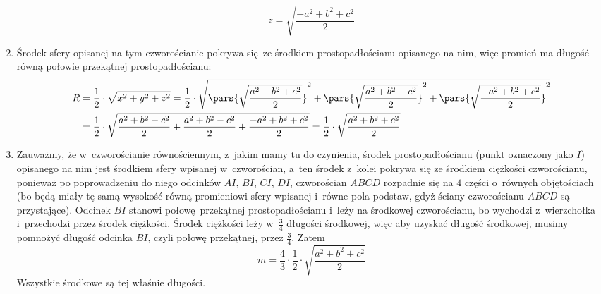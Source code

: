 \begin{enumerate}[label={\alph*)}]
\begin{equation*}
            z = \sqrt{\frac{-a^2 + b^2 + c^2}{2}}
        \end{equation*}
    \item Środek sfery opisanej na tym czworościanie pokrywa się ze środkiem prostopadłościanu opisanego na nim, więc promień ma długość równą połowie przekątnej prostopadłościanu:
        \begin{equation*}
            \begin{split}
                R
                &= \frac{1}{2} \cdot \sqrt{x^2 + y^2 + z^2}
                = \frac{1}{2} \cdot \sqrt{\pars{\sqrt{\frac{a^2 - b^2 + c^2}{2}}}^2 + \pars{\sqrt{\frac{a^2 + b^2 - c^2}{2}}}^2 + \pars{\sqrt{\frac{-a^2 + b^2 + c^2}{2}}}^2}\\
                &= \frac{1}{2} \cdot \sqrt{\frac{a^2 + b^2 - c^2}{2} + \frac{a^2 + b^2 - c^2}{2} + \frac{-a^2 + b^2 + c^2}{2}}
                = \frac{1}{2} \cdot \sqrt{\frac{a^2 + b^2 + c^2}{2}}
            \end{split}
        \end{equation*}
    \item Zauważmy, że w~czworościanie równościennym, z~jakim mamy tu do czynienia, środek prostopadłościanu (punkt oznaczony jako \(I\)) opisanego na nim jest środkiem sfery wpisanej w~czworościan, a~ten środek z~kolei pokrywa się ze środkiem ciężkości czworościanu, ponieważ po poprowadzeniu do niego odcinków \(AI\), \(BI\), \(CI\), \(DI\), czworościan \(ABCD\) rozpadnie się na \(4\) części o~równych objętościach (bo będą miały tę samą wysokość równą promieniowi sfery wpisanej i~równe pola podstaw, gdyż ściany czworościanu \(ABCD\) są przystające). Odcinek \(BI\) stanowi połowę przekątnej prostopadłościanu i~leży na środkowej czworościanu, bo wychodzi z~wierzchołka i~przechodzi przez środek ciężkości. Środek ciężkości leży w~\(\frac{3}{4}\) długości środkowej, więc aby uzyskać długość środkowej, musimy pomnożyć długość odcinka \(BI\), czyli połowę przekątnej, przez \(\frac{3}{4}\). Zatem
        \begin{equation*}
            m = \frac{4}{3} \cdot \frac{1}{2} \cdot \sqrt{\frac{a^2 + b^2 + c^2}{2}}
        \end{equation*}
        Wszystkie środkowe są tej właśnie długości.
\end{enumerate}
